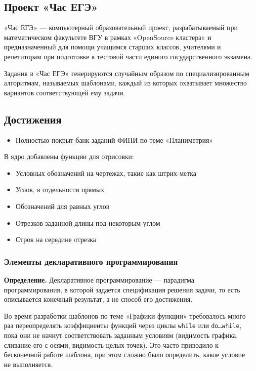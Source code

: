 \documentclass[a4paper, 12pt]{extarticle}
\begin{document}
\subsection*{Проект «Час ЕГЭ»}
«Час ЕГЭ» — компьютерный образовательный проект, разрабатываемый при математическом
факультете ВГУ в рамках «OpenSource кластера» и предназначенный для помощи учащимся
старших классов, учителями и репетиторам при подготовке к тестовой части единого государственного экзамена.

Задания в «Час ЕГЭ» генерируются случайным образом по специализированным алгоритмам, называемых шаблонами, каждый из которых охватывает множество вариантов соответствующей ему задачи.

\subsection*{Достижения}
\begin{itemize}
	\item Полностью покрыт банк заданий ФИПИ по теме «Планиметрия»
\end{itemize}
В ядро добавлены функции для отрисовки:
\begin{itemize}
	\item Условных обозначений на чертежах, такие как штрих-метка
	\item Углов, в отдельности прямых
	\item Обозначений для равных углов
	\item Отрезков заданной длины под некоторым углом
	\item Строк на середине отрезка
\end{itemize}

\subsubsection{Элементы декларативного программирования}

\textbf{Определение.} Декларативное программирование — парадигма программирования, в которой задается спецификация решения задачи, то есть описывается конечный результат, а не способ его достижения.~\cite{posobie}

Во время разработки шаблонов по теме «Графики функции» требовалось много раз переопределять коэффициенты функций через циклы 
\texttt{while} или \texttt{do\dots while}, пока они не начнут соответствовать заданным условиям (видимость графика, сливание его с осями, видимость целых точек). Это часто приводило к бесконечной работе шаблона, при этом сложно было определить, какое условие не выполняется.
\end{document}
